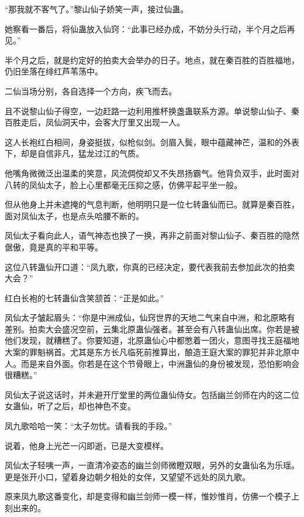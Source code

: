 
\begin{this_body}

“那我就不客气了。”黎山仙子娇笑一声，接过仙蛊。

她察看一番后，将仙蛊放入仙窍：“此事已经办成，不妨分头行动，半个月之后再见。”

半个月之后，就是约定好的拍卖大会举办的日子。地点，就在秦百胜的百胜福地，仍旧坐落在绯红芦苇荡中。

二仙当场分别，各自选择一个方向，疾飞而去。

且不说黎山仙子得空，一边赶路一边利用推杯换盏蛊联系方源。单说黎山仙子、秦百胜走后，凤仙洞天中，会客大厅里又出现一人。

这人长袍红白相间，身姿挺拔，似枪似剑。剑眉入鬓，眼中蕴藏神芒，温和的外表下，却是自信非凡，猛龙过江的气质。

他嘴角微微泛出温柔的笑意，风流倜傥却又不失昂扬霸气。他背负双手，此时面对八转的凤仙太子，脸上心里都毫无压抑之感，仿佛平起平坐一般。

但从他身上并未遮掩的气息判断，他明明只是一位七转蛊仙而已。就算是秦百胜，面对凤仙太子，也是点头哈腰不断的。

凤仙太子看向此人，语气神态也换了一换，再非之前面对黎山仙子、秦百胜的隐然倨傲，竟是真的平和平等。

这位八转蛊仙开口道：“凤九歌，你真的已经决定，要代表我前去参加此次的拍卖大会？”

红白长袍的七转蛊仙含笑颔首：“正是如此。”

凤仙太子皱起眉头：“你是中洲成仙，仙窍世界的天地二气来自中洲，和北原略有差别。拍卖大会盛况空前，云集北原蛊仙强者。甚至会有八转蛊仙出席。你若是被他们发现，就糟糕了。你要知道，北原蛊仙心中都憋着一团火，意图寻找王庭福地大案的罪魁祸首。尤其是东方长凡临死前推算出，酿造王庭大案的罪犯并非北原中人。而是来自外面。你若是在这个节骨眼上，中洲蛊仙的身份被发现，恐怕影响会很糟糕。”

凤仙太子说这话时，并未避开厅堂里的两位蛊仙侍女。包括幽兰剑师在内的这二位女蛊仙，听了之后，却也神色不变。

凤九歌哈哈一笑：“太子勿忧。请看我的手段。”

说着，他身上光芒一闪即逝，已是大变模样。

凤仙太子轻咦一声，一直清冷姿态的幽兰剑师微瞪双眼，另外的女蛊仙名为乐瑶。更是张开小口，望着身边朝夕相处的女伴，又望望不远处的凤九歌。

原来凤九歌这番变化，却是变得和幽兰剑师一模一样，惟妙惟肖，仿佛一个模子上刻出来的。


\end{this_body}
